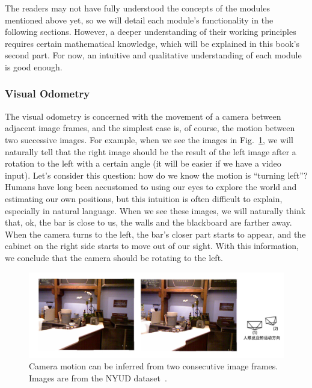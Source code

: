 The readers may not have fully understood the concepts of the modules mentioned above yet, so we will detail each module's functionality in the following sections. However, a deeper understanding of their working principles requires certain mathematical knowledge, which will be explained in this book's second part. For now, an intuitive and qualitative understanding of each module is good enough.

\subsubsection{Visual Odometry}

The visual odometry is concerned with the movement of a camera between adjacent image frames, and the simplest case is, of course, the motion between two successive images. For example, when we see the images in Fig.~\ref{fig:cameramotion}, we will naturally tell that the right image should be the result of the left image after a rotation to the left with a certain angle (it will be easier if we have a video input). Let's consider this question: how do we know the motion is ``turning left''? Humans have long been accustomed to using our eyes to explore the world and estimating our own positions, but this intuition is often difficult to explain, especially in natural language. When we see these images, we will naturally think that, ok, the bar is close to us, the walls and the blackboard are farther away. When the camera turns to the left, the bar's closer part starts to appear, and the cabinet on the right side starts to move out of our sight. With this information, we conclude that the camera should be rotating to the left.

\begin{figure}
    \centering
    \includegraphics[width=1.0\textwidth]{./resources/whatIsSLAM/cameramotion.pdf}
    \caption{Camera motion can be inferred from two consecutive image frames. Images are from the NYUD dataset~\cite{Silberman2012}.}
    \label{fig:cameramotion}
\end{figure}

